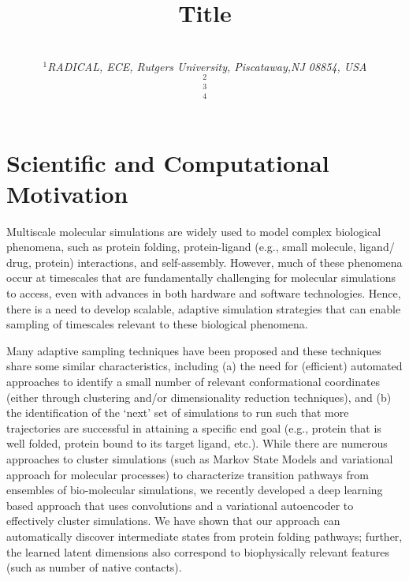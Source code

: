 \documentclass[conference,final]{IEEEtran}
\begin{document}
\title{Title}

\author{\\
   {\footnotesize{\emph{$^{1}$RADICAL, ECE, Rutgers University, Piscataway,NJ 08854, USA}}}\\
   \footnotesize{\emph{$^{2}$}}\\
   \footnotesize{\emph{$^{3}$}}\\
   \footnotesize{\emph{$^{4}$}\upp\upp\upp}
   }


\date{}
\maketitle

\section{Scientific  and Computational Motivation}

Multiscale molecular simulations are widely used to model complex biological
phenomena, such as protein folding, protein-ligand (e.g., small molecule,
ligand/ drug, protein) interactions, and self-assembly. However, much of
these phenomena occur at timescales that are fundamentally challenging for
molecular simulations to access, even with advances in both hardware and
software technologies. Hence, there is a need to develop scalable, adaptive
simulation strategies that can enable sampling of timescales relevant to
these biological phenomena.

Many adaptive sampling techniques have been proposed and these techniques
share some similar characteristics, including (a) the need for (efficient)
automated approaches to identify a small number of relevant conformational
coordinates (either through clustering and/or dimensionality reduction
techniques), and (b) the identification of the ‘next’ set of simulations to
run such that more trajectories are successful in attaining a specific end
goal (e.g., protein that is well folded, protein bound to its target ligand,
etc.). While there are numerous approaches to cluster simulations (such as
Markov State Models and variational approach for molecular processes) to
characterize transition pathways from ensembles of bio-molecular simulations,
we recently developed a deep learning based approach that uses convolutions
and a variational autoencoder to effectively cluster simulations. We have
shown that our approach can automatically discover intermediate states from
protein folding pathways; further, the learned latent dimensions also
correspond to biophysically relevant features (such as number of native
contacts).
\end{document}
